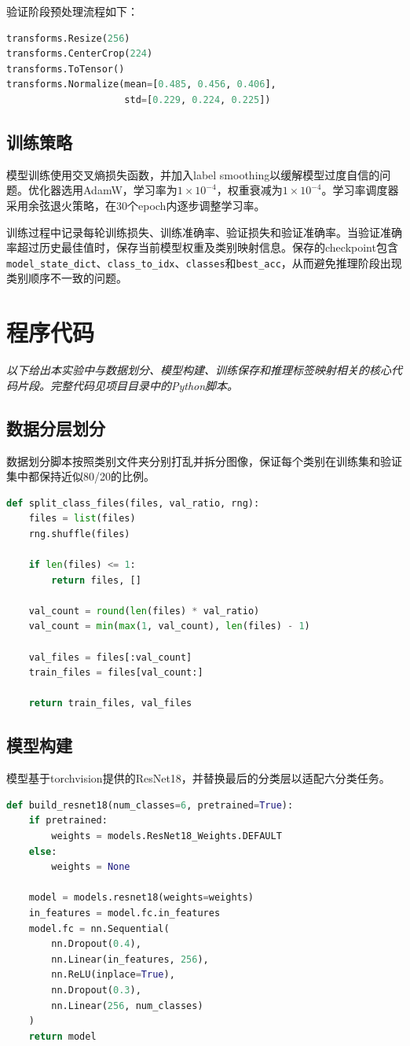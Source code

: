 \documentclass[11pt]{article}
\begin{document}
验证阶段预处理流程如下：
\begin{lstlisting}[language=Python]
transforms.Resize(256)
transforms.CenterCrop(224)
transforms.ToTensor()
transforms.Normalize(mean=[0.485, 0.456, 0.406],
                     std=[0.229, 0.224, 0.225])
\end{lstlisting}

\subsection{训练策略}
模型训练使用交叉熵损失函数，并加入label smoothing以缓解模型过度自信的问题。优化器选用AdamW，学习率为$1\times10^{-4}$，权重衰减为$1\times10^{-4}$。学习率调度器采用余弦退火策略，在30个epoch内逐步调整学习率。

训练过程中记录每轮训练损失、训练准确率、验证损失和验证准确率。当验证准确率超过历史最佳值时，保存当前模型权重及类别映射信息。保存的checkpoint包含\texttt{model\_state\_dict}、\texttt{class\_to\_idx}、\texttt{classes}和\texttt{best\_acc}，从而避免推理阶段出现类别顺序不一致的问题。

\section{程序代码}

\textit{以下给出本实验中与数据划分、模型构建、训练保存和推理标签映射相关的核心代码片段。完整代码见项目目录中的Python脚本。}

\subsection{数据分层划分}
数据划分脚本按照类别文件夹分别打乱并拆分图像，保证每个类别在训练集和验证集中都保持近似80/20的比例。
\begin{lstlisting}[language=Python]
def split_class_files(files, val_ratio, rng):
    files = list(files)
    rng.shuffle(files)

    if len(files) <= 1:
        return files, []

    val_count = round(len(files) * val_ratio)
    val_count = min(max(1, val_count), len(files) - 1)

    val_files = files[:val_count]
    train_files = files[val_count:]

    return train_files, val_files
\end{lstlisting}

\subsection{模型构建}
模型基于torchvision提供的ResNet18，并替换最后的分类层以适配六分类任务。
\begin{lstlisting}[language=Python]
def build_resnet18(num_classes=6, pretrained=True):
    if pretrained:
        weights = models.ResNet18_Weights.DEFAULT
    else:
        weights = None

    model = models.resnet18(weights=weights)
    in_features = model.fc.in_features
    model.fc = nn.Sequential(
        nn.Dropout(0.4),
        nn.Linear(in_features, 256),
        nn.ReLU(inplace=True),
        nn.Dropout(0.3),
        nn.Linear(256, num_classes)
    )
    return model
\end{lstlisting}
\end{document}
